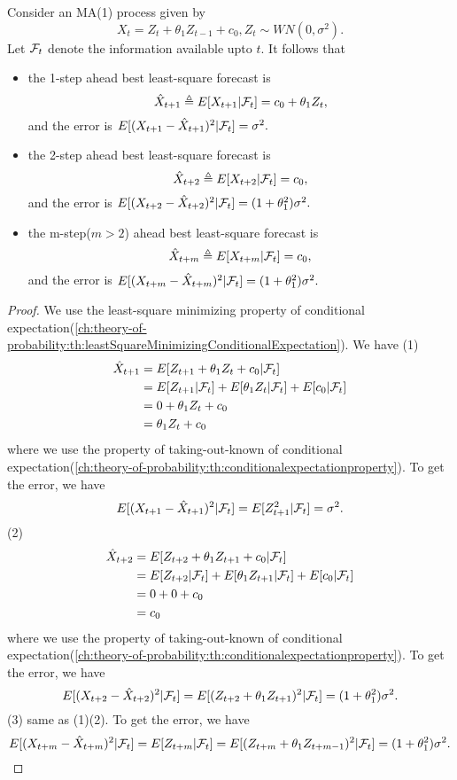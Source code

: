 \begin{lemma}\cite[62]{tsay2005analysis}
Consider an MA(1) process given by $$X_t = Z_t + \theta_1 Z_{t-1} + c_0, Z_t\sim WN(0,\sigma^2).$$
Let $\mathcal{F}_t$ denote the information available upto $t$. It follows that
\begin{itemize}
	\item the 1-step ahead best least-square forecast is
	$$\hat{X}_{t+1}\triangleq E[X_{t+1}|\mathcal{F}_t] = c_0 + \theta_1Z_t,$$
	and the error is $E[(X_{t+1} - \hat{X}_{t+1})^2|\mathcal{F}_t] = \sigma^2.$	
	\item the 2-step ahead best least-square forecast is
	$$\hat{X}_{t+2} \triangleq E[X_{t+2}|\mathcal{F}_t]= c_0,$$
	and the error is $E[(X_{t+2} - \hat{X}_{t+2})^2|\mathcal{F}_t] = (1 + \theta_1^2)\sigma^2.$	
	
	\item the m-step($m > 2$) ahead best least-square forecast is
	$$\hat{X}_{t+m} \triangleq E[X_{t+m}|\mathcal{F}_t] = c_0,$$
		and the error is $E[(X_{t+m} - \hat{X}_{t+m})^2|\mathcal{F}_t] = (1 + \theta_1^2)\sigma^2.$
\end{itemize}
\end{lemma}
\begin{proof}
We use the least-square minimizing property of conditional expectation(\autoref{ch:theory-of-probability:th:leastSquareMinimizingConditionalExpectation}). We have	
(1) 
\begin{align*}
\hat{X}_{t+1} &= E[Z_{t+1} + \theta_1 Z_{t} + c_0|\mathcal{F}_t] \\
			 &= E[Z_{t+1}|\mathcal{F}_t] + E[\theta_1 Z_{t}|\mathcal{F}_t] + E[c_0|\mathcal{F}_t] \\
			 &=0 + \theta_1 Z_{t} + c_0 \\
			 &=\theta_1 Z_{t} + c_0
\end{align*}
where we use the property of taking-out-known of conditional expectation(\autoref{ch:theory-of-probability:th:conditionalexpectationproperty}).
To get the error, we have
$$E[(X_{t+1} - \hat{X}_{t+1})^2|\mathcal{F}_t] = E[Z_{t+1}^2|\mathcal{F}_t] = \sigma^2.$$
(2) 
\begin{align*}
\hat{X}_{t+2} &= E[Z_{t+2} + \theta_1 Z_{t+1} + c_0|\mathcal{F}_t] \\
&= E[Z_{t+2}|\mathcal{F}_t] + E[\theta_1 Z_{t+1}|\mathcal{F}_t] + E[c_0|\mathcal{F}_t] \\
&=0 + 0 + c_0 \\
&= c_0
\end{align*}
where we use the property of taking-out-known of conditional expectation(\autoref{ch:theory-of-probability:th:conditionalexpectationproperty}).
To get the error, we have
$$E[(X_{t+2} - \hat{X}_{t+2})^2|\mathcal{F}_t] = E[(Z_{t+2} + \theta_1Z_{t+1})^2|\mathcal{F}_t] = (1 + \theta_1^2)\sigma^2.$$
(3) same as (1)(2). 
To get the error, we have
$$E[(X_{t+m} - \hat{X}_{t+m})^2|\mathcal{F}_t] = E[Z_{t+m}|\mathcal{F}_t] = E[(Z_{t+m} + \theta_1 Z_{t+m-1})^2|\mathcal{F}_t] = (1 + \theta_1^2)\sigma^2.$$
\end{proof}


